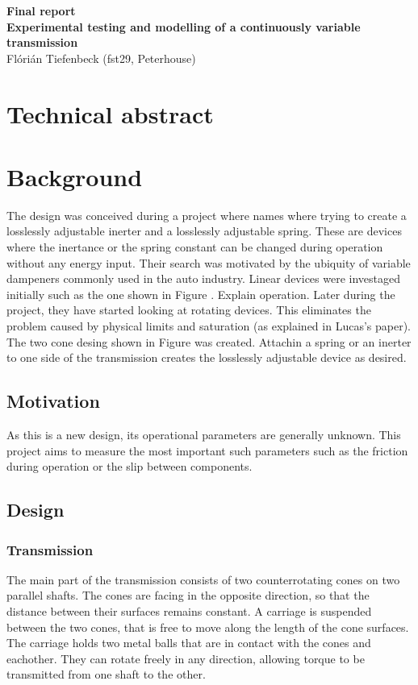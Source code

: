 \documentclass[12pt]{article}
\author{Flórián Tiefenbeck (fst29)}
\begin{document}
\begin{center}
{\Huge \bf Final report}\\
\vspace{6pt}
{\LARGE \bf Experimental testing and modelling of a continuously variable transmission}\\
\vspace{4pt}
{\LARGE Flórián Tiefenbeck (fst29, Peterhouse)}\\
\end{center}

\section{Technical abstract}

\section{Background}
The design was conceived during a project where \todo names where trying to create a losslessly adjustable inerter and a losslessly adjustable spring. These are devices where the inertance or the spring constant can be changed during operation without any energy input. Their search was motivated by the ubiquity of variable dampeners commonly used in the auto industry. Linear devices were investaged initially such as the one shown in Figure \todo. \todo Explain operation. 
Later during the project, they have started looking at rotating devices. This eliminates the problem caused by physical limits and saturation (as explained in Lucas's paper). The two cone desing shown in Figure \todo was created. Attachin a spring or an inerter to one side of the transmission creates the losslessly adjustable device as desired. 





\subsection{Motivation}
As this is a new design, its operational parameters are generally unknown. This project aims to measure the most important such parameters such as the friction during operation or the slip between components.


\subsection{Design}

\subsubsection{Transmission}
The main part of the transmission consists of two counterrotating cones on two parallel shafts. The cones are facing in the opposite direction, so that the distance between their surfaces remains constant. A carriage is suspended between the two cones, that is free to move along the length of the cone surfaces. The carriage holds two metal balls that are in contact with the cones and eachother. They can rotate freely in any direction, allowing torque to be transmitted from one shaft to the other.
\end{document}
